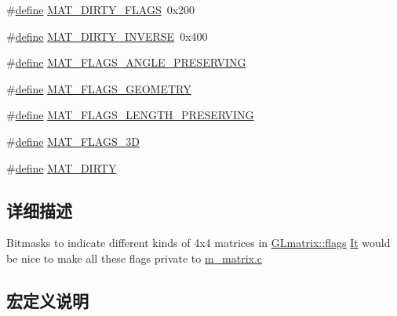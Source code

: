 \begin{DoxyCompactItemize}
\item 
\#\hyperlink{structdefine}{define} \hyperlink{group___mat_flags_ga94d6afafd36d74f41e089fe72d868a8f}{M\+A\+T\+\_\+\+D\+I\+R\+T\+Y\+\_\+\+F\+L\+A\+GS}~0x200
\item 
\#\hyperlink{structdefine}{define} \hyperlink{group___mat_flags_ga181bdf9c68ab249ba1de19e19ac7edb7}{M\+A\+T\+\_\+\+D\+I\+R\+T\+Y\+\_\+\+I\+N\+V\+E\+R\+SE}~0x400
\item 
\#\hyperlink{structdefine}{define} \hyperlink{group___mat_flags_ga0381a1be37902db79ae16d57059f8f25}{M\+A\+T\+\_\+\+F\+L\+A\+G\+S\+\_\+\+A\+N\+G\+L\+E\+\_\+\+P\+R\+E\+S\+E\+R\+V\+I\+NG}
\item 
\#\hyperlink{structdefine}{define} \hyperlink{group___mat_flags_gabbfd3b9cd83257f3d28d089484b611ad}{M\+A\+T\+\_\+\+F\+L\+A\+G\+S\+\_\+\+G\+E\+O\+M\+E\+T\+RY}
\item 
\#\hyperlink{structdefine}{define} \hyperlink{group___mat_flags_ga1ff6f6732ace580b20fb74607bc94d15}{M\+A\+T\+\_\+\+F\+L\+A\+G\+S\+\_\+\+L\+E\+N\+G\+T\+H\+\_\+\+P\+R\+E\+S\+E\+R\+V\+I\+NG}
\item 
\#\hyperlink{structdefine}{define} \hyperlink{group___mat_flags_gaf9aae4e97635565e672763f258b2de1d}{M\+A\+T\+\_\+\+F\+L\+A\+G\+S\+\_\+3D}
\item 
\#\hyperlink{structdefine}{define} \hyperlink{group___mat_flags_ga61563a06605a889426fe5a9ab04d3f98}{M\+A\+T\+\_\+\+D\+I\+R\+TY}
\end{DoxyCompactItemize}


\subsection{详细描述}
Bitmasks to indicate different kinds of 4x4 matrices in \hyperlink{struct_g_lmatrix_a5629774e886d1741cb39dba1e4fcced5}{G\+Lmatrix\+::flags} \hyperlink{class_it}{It} would be nice to make all these flags private to \hyperlink{m__matrix_8c}{m\+\_\+matrix.\+c} 

\subsection{宏定义说明}
\mbox{\label{group___mat_flags_ga61563a06605a889426fe5a9ab04d3f98}} 
